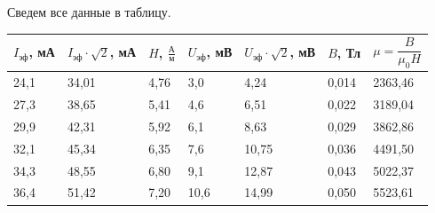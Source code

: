 \documentclass[a4paper,12pt]{article} %
\begin{document}
\newpage
Сведем все данные в таблицу.


\begin{table}[h!]
	\centering
	\begin{tabular}{|l|l|l|l|l|l|l|}
		\hline
		\multicolumn{1}{|c|}{$I_{\text{эф}}$, мА} & \multicolumn{1}{c|}{$I_{\text{эф}} \cdot \sqrt{2}$, мА} & \multicolumn{1}{c|}{$H$, $\frac{\text{А}}{\text{м}}$} & \multicolumn{1}{c|}{$U_{\text{эф}}$, мВ} & \multicolumn{1}{c|}{$U_{\text{эф}} \cdot \sqrt{2}$, мВ} & \multicolumn{1}{c|}{$B$, Тл} & \multicolumn{1}{c|}{$\mu = \dfrac{B}{\mu_0 H}$} \\ \hline
		24,1                                      & 34,01                                                   & 4,76                                                  & 3,0                                      & 4,24                                                    & 0,014                        & 2363,46                                         \\ \hline
		27,3                                      & 38,65                                                   & 5,41                                                  & 4,6                                      & 6,51                                                    & 0,022                        & 3189,04                                         \\ \hline
		29,9                                      & 42,31                                                   & 5,92                                                  & 6,1                                      & 8,63                                                    & 0,029                        & 3862,86                                         \\ \hline
		32,1                                      & 45,34                                                   & 6,35                                                  & 7,6                                      & 10,75                                                   & 0,036                        & 4491,50                                         \\ \hline
		34,3                                      & 48,55                                                   & 6,80                                                  & 9,1                                      & 12,87                                                   & 0,043                        & 5022,37                                         \\ \hline
		36,4                                      & 51,42                                                   & 7,20                                                  & 10,6                                     & 14,99                                                   & 0,050                        & 5523,61                                         \\ \hline

\end{tabular}
\end{table}
\end{document}
